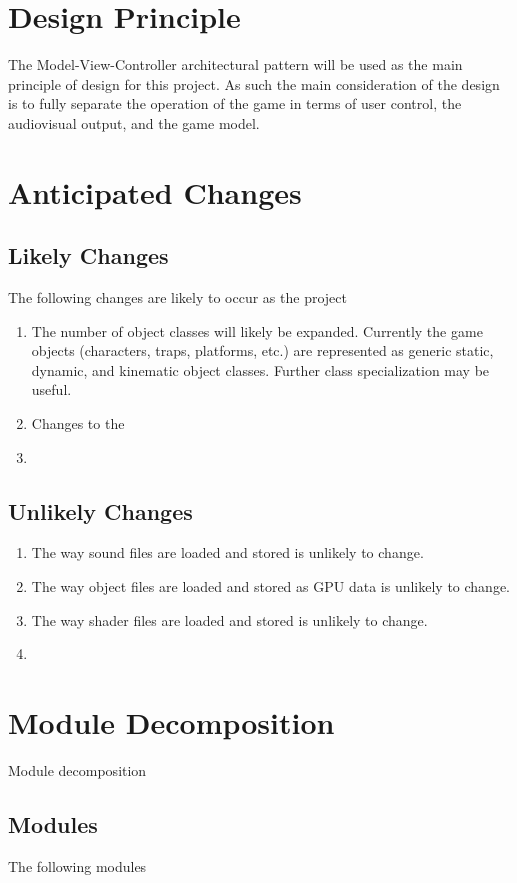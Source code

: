 \documentclass[12pt, titlepage]{article}
\begin{document}
\section{Design Principle}
The Model-View-Controller architectural pattern will be used as the main principle of design for this project.  As such the main consideration of the design is to fully separate the operation of the game in terms of user control, the audiovisual output, and the game model. 



\section{Anticipated Changes}
\subsection{Likely Changes}
The following changes are likely to occur as the project 
\begin{enumerate}[label=AC\arabic*]
  \item The number of object classes will likely be expanded.  Currently the game objects (characters, traps, platforms, etc.) are represented as generic static, dynamic, and kinematic object classes.  Further class specialization may be useful.
  \item Changes to the 
  \item 
\end{enumerate}

\subsection{Unlikely Changes}
\begin{enumerate}[label=UC\arabic*]
  \item The way sound files are loaded and stored is unlikely to change.
  \item The way object files are loaded and stored as GPU data is unlikely to change. 
  \item The way shader files are loaded and stored is unlikely to change.
  \item 
\end{enumerate}

\section{Module Decomposition}
Module decomposition 

\subsection{Modules}
The following modules 
\end{document}

